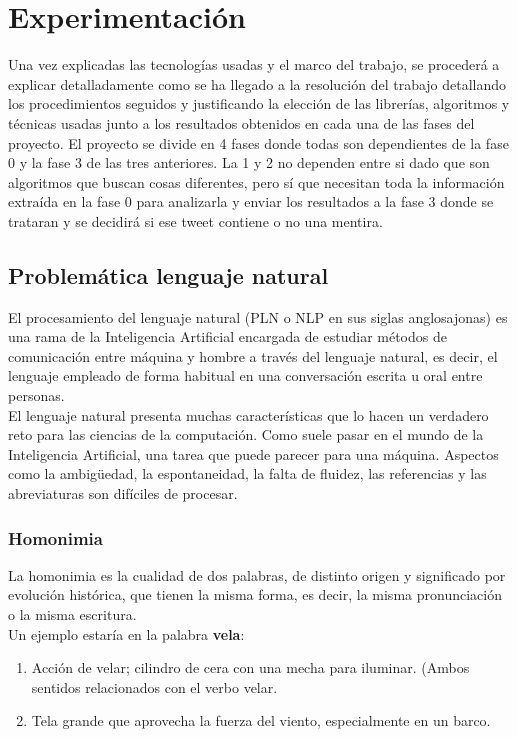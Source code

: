 \documentclass[../all.tex]{subfiles}
\begin{document}
\section{Experimentación} %
	Una vez explicadas las tecnologías usadas y el marco del trabajo, se procederá a explicar detalladamente como se ha llegado a la resolución del trabajo detallando los procedimientos seguidos y justificando la elección de las librerías, algoritmos y técnicas usadas junto a los resultados obtenidos en cada una de las fases del proyecto.  El proyecto se divide en 4 fases donde todas son dependientes de la fase 0 y la fase 3 de las tres anteriores.  La 1 y 2 no dependen entre si dado que son algoritmos que buscan cosas diferentes, pero sí que necesitan toda la información extraída en la fase 0 para analizarla y enviar los resultados a la fase 3 donde se trataran y se decidirá si ese tweet contiene o no una mentira.
	
\subsection{Problemática lenguaje natural}
	El procesamiento del lenguaje natural (PLN o NLP en sus siglas anglosajonas) es una rama de la Inteligencia Artificial encargada de estudiar métodos de comunicación entre máquina y hombre a través del lenguaje natural, es decir, el lenguaje empleado de forma habitual en una conversación escrita u oral entre personas.\\ 
	
	El lenguaje natural presenta muchas características que lo hacen un verdadero reto para las ciencias de la computación. Como suele pasar en el mundo de la Inteligencia Artificial, una tarea que puede parecer para una máquina. Aspectos como la ambigüedad, la espontaneidad, la falta de fluidez, las referencias y las abreviaturas son difíciles de procesar.

\subsubsection{Homonimia}
	La homonimia  es la cualidad de dos palabras, de distinto origen y significado por evolución histórica, que tienen la misma forma, es decir, la misma pronunciación o la misma escritura\cite{HomonimiaPolisemia}.\\
	
	Un ejemplo estaría en la palabra \textbf{vela}:
	\begin{enumerate}[resume]
		\setcounter{enumi}{0}
		\item Acción de velar; cilindro de cera con una mecha para iluminar. (Ambos sentidos relacionados con el verbo velar.
		\item Tela grande que aprovecha la fuerza del viento, especialmente en un barco.
	\end{enumerate}
\end{document}
